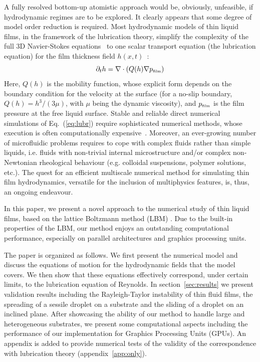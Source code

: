 A fully resolved bottom-up atomistic approach would be, obviously, unfeasible, if hydrodynamic regimes are to be explored. 
It clearly appears that some degree of model order reduction is required. 
Most hydrodynamic models of thin liquid films, in the framework of the lubrication theory, simplify the complexity of the full 3D Navier-Stokes equations~\cite{claude-louis-marie-henriMemoireLoisMouvement1827, stokesSteadyMotionIncompressible1848} to one scalar transport equation (the lubrication equation) for the film thickness field $h(x,t)$~\cite{reynoldsTheoryLubricationIts1886,oronLongscaleEvolutionThin1997,crasterDynamicsStabilityThin2009,mitlinDewettingSolidSurface1993}:
\begin{equation}\label{eq:lubr}
    \partial_t h = \nabla \cdot \left(Q(h)\nabla p_{\mbox{\tiny{film}}}\right)
\end{equation}
Here, $Q(h)$ is the mobility function, whose explicit form depends on the boundary condition for the velocity at the surface (for a no-slip boundary, $Q(h) = h^3/(3 \mu)$, with $\mu$ being the dynamic viscosity), and $p_{\mbox{\tiny{film}}}$ is the film pressure at the free liquid surface.
Stable and reliable direct numerical simulations of Eq.~(\ref{eq:lubr}) require sophisticated numerical methods, whose execution is often computationally expensive~\cite{beckerComplexDewettingScenarios2003}.
Moreover, an ever-growing number of microfluidic problems requires to cope with complex fluids rather than simple liquids, i.e. fluids with non-trivial internal microstructure and/or complex non-Newtonian rheological behaviour (e.g. colloidal suspensions, polymer solutions, etc.). 
The quest for an efficient multiscale numerical method for simulating thin film hydrodynamics, versatile for the inclusion of multiphysics features, is, thus, an ongoing endeavour. 

In this paper, we present a novel approach to the numerical study of thin liquid films, based on the lattice Boltzmann method (LBM) \cite{succiLatticeBoltzmannEquation2001}. 
Due to the built-in properties of the LBM, our method enjoys an outstanding computational performance, especially on parallel architectures and graphics processing units. 

The paper is organized as follows. 
We first present the numerical model and discuss the equations of motion for the hydrodynamic fields that the model covers. 
We then show that these equations effectively correspond, under certain limits, to the lubrication equation of Reynolds.
In section~\ref{sec:results} we present validation results including the Rayleigh-Taylor instability of thin fluid films, the spreading of a sessile droplet on a substrate and the sliding of a droplet on an inclined plane. 
After showcasing the ability of our method to handle large and heterogeneous substrates, we present some computational aspects including the performance of our implementation for Graphics Processing Units (GPUs). 
An appendix is added to provide numerical tests of the validity of the correspondence with lubrication theory (appendix~\ref{app:only}).

